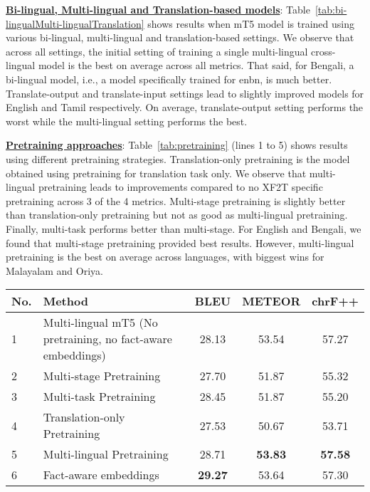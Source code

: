 \documentclass[runningheads]{llncs}
\newcommand{\data}{\textsc{XAlignV2}}
\begin{document}
\noindent\underline{\textbf{Bi-lingual, Multi-lingual and Translation-based models}}: Table~\ref{tab:bi-lingualMulti-lingualTranslation} shows results when mT5 model is trained using various bi-lingual, multi-lingual and translation-based settings. We observe that across all settings, the initial setting of training a single multi-lingual cross-lingual model is the best on average across all metrics. That said, for Bengali, a bi-lingual model, i.e., a model specifically trained for enbn, is much better. Translate-output and translate-input settings lead to slightly improved models for English and Tamil respectively. On average, translate-output setting performs the worst while the multi-lingual setting performs the best.







\noindent\underline{\textbf{Pretraining approaches}}: Table~\ref{tab:pretraining} (lines 1 to 5) shows results using different pretraining strategies. Translation-only pretraining is the model obtained using pretraining for translation task only. We observe that multi-lingual pretraining leads to improvements compared to no XF2T specific pretraining across 3 of the 4 metrics. Multi-stage pretraining is slightly better than translation-only pretraining but not as good as multi-lingual pretraining. Finally, multi-task performs better than multi-stage. For English and Bengali, we found that multi-stage pretraining provided best results. However, multi-lingual pretraining is the best on average across languages, with biggest wins for Malayalam and Oriya. 

\begin{table*}
    \centering
    \scriptsize
    \begin{tabular}{|l|p{2.5in}||c|c|c|}
\hline
No.&Method&BLEU&METEOR&chrF++\\
\hline
\hline
1&Multi-lingual mT5 (No pretraining, no fact-aware embeddings) &28.13&53.54&57.27\\
\hline
2&Multi-stage Pretraining&27.70&51.87&55.32\\
\hline
3&Multi-task Pretraining&28.45&51.87&55.20\\
\hline
4&Translation-only  Pretraining&27.53&50.67&53.71\\
\hline
5&Multi-lingual Pretraining&28.71&\textbf{53.83}&\textbf{57.58}\\
\hline
6&Fact-aware embeddings&\textbf{29.27}&53.64&57.30\\
\hline
\end{tabular}
    \caption{XF2T scores on \data{} test set using different pretraining strategies and fact-aware embeddings for the mT5 model. Best results  are highlighted.}
    \label{tab:pretraining}
\end{table*}
\end{document}
